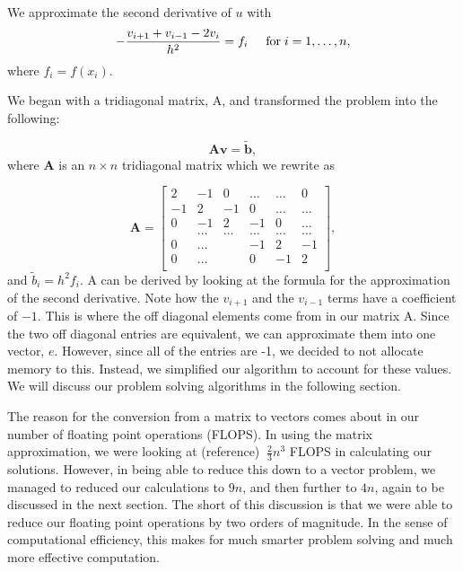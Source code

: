 \documentclass{article}
\begin{document}
We  approximate the second derivative of $u$ with
\begin{equation*}
-\frac{v_{i+1}+v_{i-1}-2v_i}{h^2} = f_i  \hspace{0.5cm} \mathrm{for} \hspace{0.1cm} i=1,\dots, n,
\end{equation*}
where $f_i=f(x_i)$.



We began with a tridiagonal matrix, A, and transformed the problem into the following:

\begin{equation*}
\mathbf{A}\mathbf{v} = \tilde{\mathbf{b}},
\end{equation*}
where $\mathbf{A}$ is an $n\times n$  tridiagonal matrix which we rewrite as

\[
\mathbf{A} = \begin{bmatrix}
2& -1& 0 &\dots   & \dots &0 \\
-1 & 2 & -1 &0 &\dots &\dots \\
0&-1 &2 & -1 & 0 & \dots \\
& \dots   & \dots &\dots   &\dots & \dots \\
0&\dots   &  &-1 &2& -1 \\
0&\dots    &  & 0  &-1 & 2 \\
\end{bmatrix},
\]
and $\tilde{b}_i=h^2f_i$.  A can be derived by looking at the formula for the approximation of the second derivative. Note how the $v_{i+1}$ and the $v_{i-1}$ terms have a coefficient of $-1$. This is where the off diagonal elements come from in our matrix A. Since the two off diagonal entries are equivalent, we can approximate them into one vector, $e$. However, since all of the entries are -1, we decided to not allocate memory to this. Instead, we simplified our algorithm to account for these values. We will discuss our problem solving algorithms in the following section.

The reason for the conversion from a matrix to vectors comes about in our number of floating point operations (FLOPS). In using the matrix approximation, we were looking at (reference) $~\frac{2}{3}n^{3}$ FLOPS in calculating our solutions. However, in being able to reduce this down to a vector problem, we managed to reduced our calculations to $9n$, and then further to $4n$, again to be discussed in the next section. The short of this discussion is that we were able to reduce our floating point operations by two orders of magnitude. In the sense of computational efficiency, this makes for much smarter problem solving and much more effective computation. 
\end{document}
